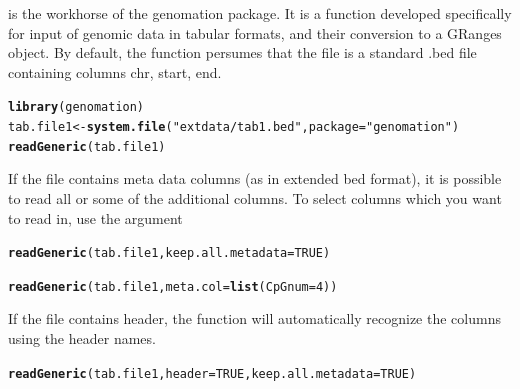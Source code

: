 \documentclass{article}\usepackage[]{graphicx}\usepackage[]{color}
\makeatletter
\newcommand{\hlnum}[1]{\textcolor[rgb]{0.686,0.059,0.569}{#1}}%
\newcommand{\hlstr}[1]{\textcolor[rgb]{0.192,0.494,0.8}{#1}}%
\newcommand{\hlstd}[1]{\textcolor[rgb]{0.345,0.345,0.345}{#1}}%
\newcommand{\hlkwb}[1]{\textcolor[rgb]{0.69,0.353,0.396}{#1}}%
\newcommand{\hlkwc}[1]{\textcolor[rgb]{0.333,0.667,0.333}{#1}}%
\newcommand{\hlkwd}[1]{\textcolor[rgb]{0.737,0.353,0.396}{\textbf{#1}}}%
\newenvironment{kframe}{%
 \def\at@end@of@kframe{}%
 \ifinner\ifhmode%
  \def\at@end@of@kframe{\end{minipage}}%
  \begin{minipage}{\columnwidth}%
 \fi\fi%
 \def\FrameCommand##1{\hskip\@totalleftmargin \hskip-\fboxsep
 \colorbox{shadecolor}{##1}\hskip-\fboxsep
     \hskip-\linewidth \hskip-\@totalleftmargin \hskip\columnwidth}%
 \MakeFramed {\advance\hsize-\width
   \@totalleftmargin\z@ \linewidth\hsize
   \@setminipage}}%
 {\par\unskip\endMakeFramed%
 \at@end@of@kframe}
\newenvironment{knitrout}{}{} %
\makeatother
\begin{document}
 is the workhorse of the genomation package. It is a function
developed specifically for input of genomic data in tabular formats, and their conversion
to a GRanges object. 
By default, the function persumes that the file is a standard .bed file containing columns chr, start, end.
\begin{knitrout}
\color{fgcolor}\begin{kframe}
\begin{alltt}
\hlkwd{library}\hlstd{(genomation)}
\hlstd{tab.file1} \hlkwb{<-} \hlkwd{system.file}\hlstd{(}\hlstr{"extdata/tab1.bed"}\hlstd{,} \hlkwc{package} \hlstd{=} \hlstr{"genomation"}\hlstd{)}
\hlkwd{readGeneric}\hlstd{(tab.file1)}
\end{alltt}
\end{kframe}
\end{knitrout}


If the file contains meta data columns (as in extended bed format), 
it is possible to read all or some of the additional columns.
To select columns which you want to read in, use the  argument 
\begin{knitrout}
\color{fgcolor}\begin{kframe}
\begin{alltt}
\hlkwd{readGeneric}\hlstd{(tab.file1,} \hlkwc{keep.all.metadata} \hlstd{=} \hlnum{TRUE}\hlstd{)}

\hlkwd{readGeneric}\hlstd{(tab.file1,} \hlkwc{meta.col} \hlstd{=} \hlkwd{list}\hlstd{(}\hlkwc{CpGnum} \hlstd{=} \hlnum{4}\hlstd{))}
\end{alltt}
\end{kframe}
\end{knitrout}


If the file contains header, the function will automatically recognize the 
columns using the header names.
\begin{knitrout}
\color{fgcolor}\begin{kframe}
\begin{alltt}
\hlkwd{readGeneric}\hlstd{(tab.file1,} \hlkwc{header} \hlstd{=} \hlnum{TRUE}\hlstd{,} \hlkwc{keep.all.metadata} \hlstd{=} \hlnum{TRUE}\hlstd{)}
\end{alltt}
\end{kframe}
\end{knitrout}
\end{document}
